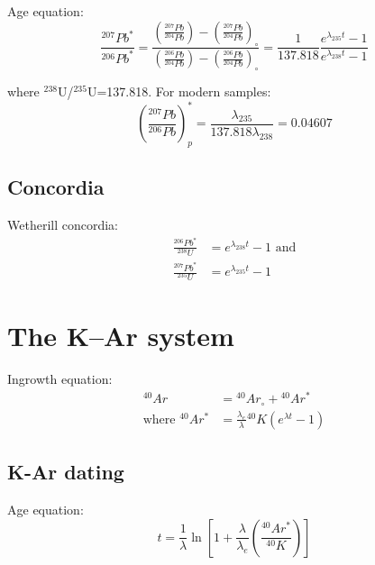 \documentclass{article}
\begin{document}
\begin{multicols}{3}
Age equation:
\begin{equation}
\frac{^{207}Pb^*}{^{206}Pb^*} = 
\frac{\left(\frac{^{207}Pb}{^{204}Pb}\right)-\left(\frac{^{207}Pb}{^{204}Pb}\right)_\circ}
{\left(\frac{^{206}Pb}{^{204}Pb}\right)-\left(\frac{^{206}Pb}{^{204}Pb}\right)_\circ}
= \frac{1}{137.818} \frac{e^{\lambda_{235}t}-1}{e^{\lambda_{238}t}-1}
\label{eq:PbPb}
\end{equation}

where $^{238}$U/$^{235}$U=137.818. For modern samples:
\begin{equation}
  \left(\frac{^{207}Pb}{^{206}Pb}\right)^*_p =
  \frac{\lambda_{235}}{137.818\lambda_{238}} = 0.04607
\label{eq:commonPb}
\end{equation}

\subsection{Concordia}
\label{sec:intro2concordia}

Wetherill concordia:
\begin{equation}
\begin{array}{rl}
\frac{^{206}Pb^*}{^{238}U} & = e^{\lambda_{238}t}-1 \mbox{~and}\\
\frac{^{207}Pb^*}{^{235}U} & = e^{\lambda_{235}t}-1
\end{array}
\label{eq:wetherill}
\end{equation}

\begingroup
\def\svgwidth{.25\textwidth}

\endgroup

\section{The K--Ar system}
\label{sec:K-Ar}

Ingrowth equation:
\begin{equation}
\begin{array}{rl}
^{40}Ar & = {}^{40}Ar_\circ + {}^{40}Ar^*\\ 
\mbox{where~} {}^{40}Ar^* & =
  \frac{\lambda_e}{\lambda} {}^{40}K \left( e^{\lambda t} - 1 \right)
\end{array}
\label{eq:Ar}
\end{equation}

\subsection{K-Ar dating}

Age equation:
\begin{equation}
t = \frac{1}{\lambda} \ln\left[ 1 + \frac{\lambda}{\lambda_e}
  \left(\frac{^{40}Ar^*}{^{40}K}\right) \right]
\label{eq:K-Ar}
\end{equation}


\end{multicols}
\end{document}

